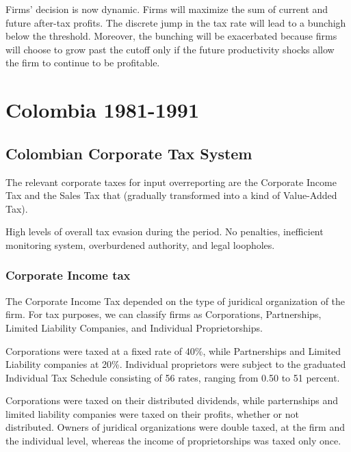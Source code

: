 \documentclass[
  12pt]{article}
\begin{document}
Firms' decision is now dynamic. Firms will maximize the sum of current
and future after-tax profits. The discrete jump in the tax rate will
lead to a bunchigh below the threshold. Moreover, the bunching will be
exacerbated because firms will choose to grow past the cutoff only if
the future productivity shocks allow the firm to continue to be
profitable.

\hypertarget{colombia-1981-1991}{%
\section{Colombia 1981-1991}\label{colombia-1981-1991}}

\hypertarget{colombian-corporate-tax-system}{%
\subsection{Colombian Corporate Tax
System}\label{colombian-corporate-tax-system}}

The relevant corporate taxes for input overreporting are the Corporate
Income Tax and the Sales Tax that (gradually transformed into a kind of
Value-Added Tax).

High levels of overall tax evasion during the period. No penalties,
inefficient monitoring system, overburdened authority, and legal
loopholes.

\hypertarget{corporate-income-tax}{%
\subsubsection{Corporate Income tax}\label{corporate-income-tax}}

The Corporate Income Tax depended on the type of juridical organization
of the firm. For tax purposes, we can classify firms as Corporations,
Partnerships, Limited Liability Companies, and Individual
Proprietorships.

Corporations were taxed at a fixed rate of 40\%, while Partnerships and
Limited Liability companies at 20\%. Individual proprietors were subject
to the graduated Individual Tax Schedule consisting of 56 rates, ranging
from 0.50 to 51 percent.

Corporations were taxed on their distributed dividends, while
parternships and limited liability companies were taxed on their
profits, whether or not distributed. Owners of juridical organizations
were double taxed, at the firm and the individual level, whereas the
income of proprietorships was taxed only once.
\end{document}
